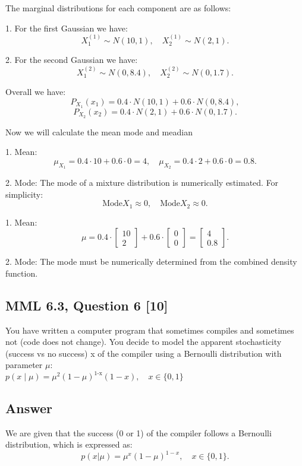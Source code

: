 \documentclass[12pt]{article}
\begin{document}
The marginal distributions for each component are as follows:

1. For the first Gaussian we have:
\[
X_1^{(1)} \sim N(10, 1), \quad X_2^{(1)} \sim N(2, 1).
\]

2. For the second Gaussian we have:
\[
X_1^{(2)} \sim N(0, 8.4), \quad X_2^{(2)} \sim N(0, 1.7).
\]

Overall we have:
\[
P_{X_1}(x_1) = 0.4 \cdot N(10, 1) + 0.6 \cdot N(0, 8.4),
\]
\[
P_{X_2}(x_2) = 0.4 \cdot N(2, 1) + 0.6 \cdot N(0, 1.7).
\]

Now we will calculate the mean mode and meadian

1. Mean:
\[
\mu_{X_1} = 0.4 \cdot 10 + 0.6 \cdot 0 = 4, \quad \mu_{X_2} = 0.4 \cdot 2 + 0.6 \cdot 0 = 0.8.
\]

2. Mode: The mode of a mixture distribution is numerically estimated. For simplicity:
\[
\text{Mode}{X_1} \approx 0, \quad \text{Mode}{X_2} \approx 0.
\]

1. Mean:
\[
\mu = 0.4 \cdot \begin{bmatrix} 10 \\ 2 \end{bmatrix} + 0.6 \cdot \begin{bmatrix} 0 \\ 0 \end{bmatrix} = \begin{bmatrix} 4 \\ 0.8 \end{bmatrix}.
\]

2. Mode: The mode must be numerically determined from the combined density function.

\subsection*{MML 6.3, Question 6 [10]}
You have written a computer program that sometimes compiles and sometimes not (code does not change). You decide to model the apparent  stochasticity (success vs no success) x of the compiler using a Bernoulli distribution with parameter \( \mu \):\\
\( p(x \mid \mu) = \mu ^2 (1 - \mu)^{\text{1-x}} (1 - x) , \quad x \in \{0, 1\} \)
\subsection*{Answer}
We are given that the success (0 or 1) of the compiler follows a Bernoulli distribution, which is expressed as:
\[
p(x | \mu) = \mu^x (1 - \mu)^{1-x}, \quad x \in \{0, 1\}.
\]
\end{document}
